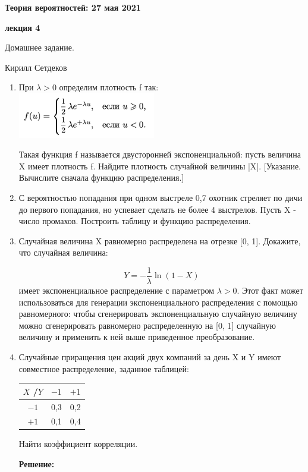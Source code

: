 \documentclass[a4paper,12pt]{article}
\newcounter{z}
\renewcommand{\date}{{\bf 27 мая 2021}}
\newcommand{\HSEhat}{
\vspace*{-0pt}
\noindent
\setcounter{z}{0}


{\bf \phantom{\date}  \large \hfill Теория вероятностей: \hfill \normalsize \date}

\vspace{5 pt}
{\bf \large \hfill  лекция 4\hfill }

\vspace{15 pt}
\centerline{ \large  Домашнее задание.}
\centerline{ \large  Кирилл Сетдеков}



\vspace*{10pt}
\setcounter{z}{0}

}
\begin{document}
\HSEhat


\begin{enumerate}

\subsection*{Задачи:}


\item	При $\lambda > 0$ определим плотность f так: \\
\includegraphics[width=6cm]{img/task1.png}

Такая функция f называется двусторонней экспоненциальной: пусть величина X имеет плотность f. Найдите плотность случайной величины |X|. [Указание. Вычислите сначала функцию распределения.]
\item	С вероятностью попадания при одном выстреле 0,7 охотник стреляет по дичи до первого попадания, но успевает сделать не более 4 выстрелов. Пусть X - число промахов. Построить таблицу и функцию распределения. 
\item	Случайная величина X равномерно распределена на отрезке [0, 1]. Докажите, что случайная величина:
 
$$Y = -\frac{1}{\lambda}\ln{(1-X)}$$
имеет экспоненциальное распределение с параметром $\lambda > 0$. Этот факт может использоваться для генерации экспоненциального распределения с помощью равномерного: чтобы сгенерировать экспоненциальную случайную величину можно сгенерировать равномерно распределенную на [0, 1] случайную величину и применить к ней выше приведенное преобразование. 
\item	 Случайные приращения цен акций двух компаний за день X и Y имеют совместное распределение, заданное таблицей:
\begin{center}
 \begin{tabular}{|c| c| c |} 
 \hline
 $X$ \slash $Y$ & $-1$& $+1$ \\ [0.5ex] 
 \hline
 $-1$ & 0,3 & 0,2 \\ 
 \hline
 $+1$ & 0,1	 & 0,4  \\ 
 \hline
\end{tabular}
\end{center}

Найти коэффициент корреляции.

\textbf{Решение:}\\


\end{enumerate}
\end{document}
